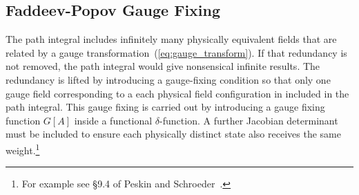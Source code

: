 \subsection{Faddeev-Popov Gauge Fixing}
\label{sec:gauge_fixing}

The path integral includes infinitely many physically equivalent fields that are related by a gauge transformation~(\ref{eq:gauge_transform}).
If that redundancy is not removed, the path integral would give nonsensical infinite results.
The redundancy is lifted by introducing a gauge-fixing condition so that only one gauge field 
corresponding to a each physical field configuration in included in the path integral.  %
This gauge fixing is carried out by introducing a gauge fixing function $G[A]$ inside a functional $\delta$-function.
A further Jacobian determinant must be included to ensure each physically distinct state also receives the same weight.\footnote{
For example see \S 9.4 of Peskin and Schroeder~\cite{Peskin1995}.}

